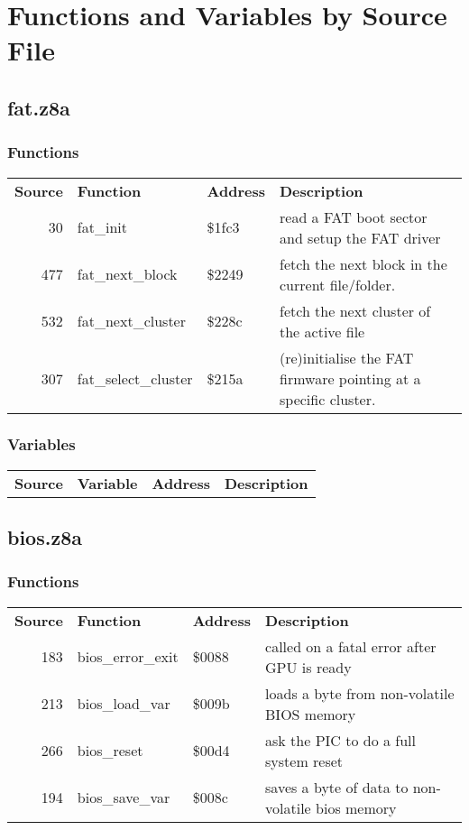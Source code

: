 \section{Functions and Variables by Source File}
\subsection{fat.z8a}
\subsubsection{Functions}
\begin{tabular}{rllp{7cm}}
 \textbf{Source}&\textbf{Function}&\textbf{Address}&\textbf{Description}\\
 30&fat\_init&\$1fc3&read a FAT boot sector and setup the FAT driver\\
 477&fat\_next\_block&\$2249&fetch the next block in the current file/folder.\\
 532&fat\_next\_cluster&\$228c&fetch the next cluster of the active file\\
 307&fat\_select\_cluster&\$215a&(re)initialise the FAT firmware pointing at a specific cluster.\\
\end{tabular}

\subsubsection{Variables}
\begin{tabular}{rllp{7cm}}
 \textbf{Source}&\textbf{Variable}&\textbf{Address}&\textbf{Description}\\
\end{tabular}

\subsection{bios.z8a}
\subsubsection{Functions}
\begin{tabular}{rllp{7cm}}
 \textbf{Source}&\textbf{Function}&\textbf{Address}&\textbf{Description}\\
 183&bios\_error\_exit&\$0088&called on a fatal error after GPU is ready\\
 213&bios\_load\_var&\$009b&loads a byte from non-volatile BIOS memory\\
 266&bios\_reset&\$00d4&ask the PIC to do a full system reset\\
 194&bios\_save\_var&\$008c&saves a byte of data to non-volatile bios memory\\
\end{tabular}


